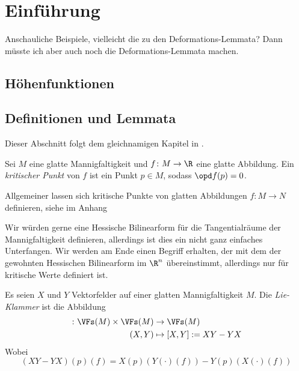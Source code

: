 \chapter{Einführung}

Anschauliche Beispiele, vielleicht die zu den Deformations-Lemmata? Dann müsste
ich aber auch noch die Deformations-Lemmata machen.

\section{Höhenfunktionen}

\section{Definitionen und Lemmata}

Dieser Abschnitt folgt dem gleichnamigen Kapitel in \cite{milnor}.

\begin{definition}
    \label{def: kritischer Punkt}
    Sei $M$ eine glatte Mannigfaltigkeit und $f \colon M \to \R$ eine glatte Abbildung. 
    Ein \textit{kritischer Punkt} von $f$ ist ein Punkt $p \in M$, sodass $\opd f (p) = 0$.
\end{definition}

\begin{remark}
    Allgemeiner lassen sich kritische Punkte von glatten Abbildungen $f \colon M \to N$ 
    definieren, siehe im Anhang %
\end{remark}

Wir würden gerne eine Hessische Bilinearform für die Tangentialräume der Mannigfaltigkeit
definieren, allerdings ist dies ein nicht ganz einfaches Unterfangen. Wir werden am Ende
einen Begriff erhalten, der mit dem der gewohnten Hessischen Bilinearform im $\R^n$
übereinstimmt, allerdings nur für kritische Werte definiert ist.

\begin{definition}
    \label{def: lie-klammer}
    Es seien $X$ und $Y$ Vektorfelder auf einer glatten Mannigfaltigkeit $M$. Die 
    \textit{Lie-Klammer} ist die Abbildung 
    \begin{align*} 
        [\cdot, \cdot] \colon \VFs(M) \times \VFs(M) & \to \VFs(M) \\
        (X, Y) & \mapsto [X, Y] := XY - YX
    \end{align*}
    Wobei 
    \[ (XY - YX) (p) (f) = X(p)(Y(\cdot)(f)) - Y(p)(X(\cdot)(f)) \]
\end{definition}

